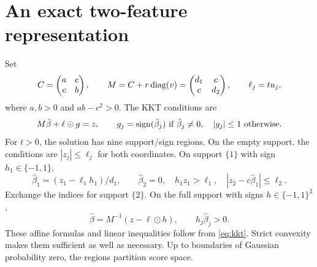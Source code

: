\section{An exact two-feature representation}

Set
\[
 C = \begin{pmatrix}
      a & c \\
      c & b
     \end{pmatrix},\qquad M
   = C + r\operatorname{diag}(v)
   = \begin{pmatrix}
      d_1 & c   \\
      c   & d_2
     \end{pmatrix},\qquad \ell_j
   = tu_j,
\]
where $a,b > 0$ and $ab - c^2 > 0$. The KKT conditions are
\begin{equation}
 \label{eq:kkt}
 M\hat\beta + \ell \odot g = z,\qquad g_j
                           = \operatorname{sign}(\hat\beta_j)\ \text{if }\hat\beta_j
                           \ne 0, \quad |g_j|
                           \le 1\ \text{otherwise}.
\end{equation}
For $t > 0$, the solution has nine support/sign regions. On the empty support,
the conditions are $|z_j| \le \ell_j$ for both coordinates. On support $\{1\}$
with sign $h_1 \in \{-1,1\}$,
\[
 \hat\beta_1 = (z_1 - \ell_1h_1)/d_1,\qquad \hat\beta_2
             = 0, \quad h_1z_1
             > \ell_1,\quad |z_2 - c\hat\beta_1|
             \le \ell_2.
\]
Exchange the indices for support $\{2\}$. On the full support with signs
$h \in \{-1,1\}^2$,
\begin{equation}
 \label{eq:both-active}
 \hat\beta = M^{-1}(z - \ell \odot h),\qquad h_j\hat\beta_j > 0.
\end{equation}
These affine formulas and linear inequalities follow from \eqref{eq:kkt}. Strict
convexity makes them sufficient as well as necessary. Up to boundaries of
Gaussian probability zero, the regions partition score space.

